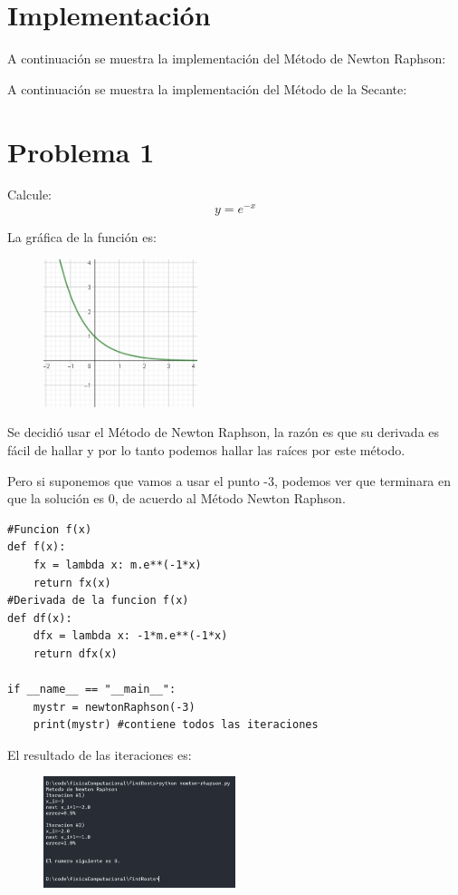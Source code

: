 \documentclass[a4paper,12pt]{article}
\begin{document}
    \section{Implementación}
    A continuación se muestra la implementación del Método de Newton Raphson:
    

    A continuación se muestra la implementación del Método de la Secante:
    

    \newpage

    \section{Problema 1}
    Calcule:
    \begin{equation}
        y = e^{-x}
    \end{equation}
    
    La gráfica de la función es:

    \begin{figure}[h]
        \centering
        \includegraphics[width=0.4\textwidth]{f1.PNG}
    \end{figure}

    Se decidió usar 
    el Método de Newton Raphson, la razón es que su derivada es fácil 
    de hallar y por lo tanto
    podemos hallar las raíces por este método.

    Pero si suponemos que vamos a usar el punto -3, podemos ver que terminara en 
    que la solución es 0, de acuerdo al Método Newton Raphson.

\begin{lstlisting}
#Funcion f(x)
def f(x):
    fx = lambda x: m.e**(-1*x)
    return fx(x)
#Derivada de la funcion f(x)
def df(x):
    dfx = lambda x: -1*m.e**(-1*x)
    return dfx(x)

if __name__ == "__main__":
    mystr = newtonRaphson(-3)
    print(mystr) #contiene todos las iteraciones
\end{lstlisting}
    \newpage
    El resultado de las iteraciones es:
    \begin{figure}[h]
        \centering
        \includegraphics[width=0.5\textwidth]{f1console.PNG}
    \end{figure}
\end{document}
